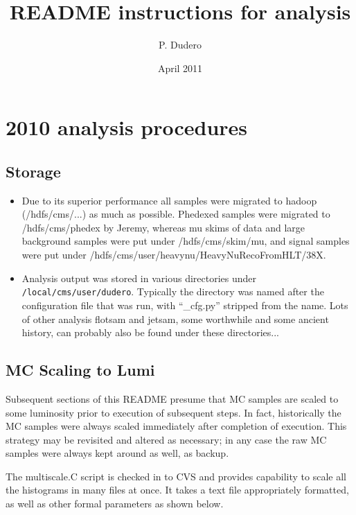 \documentclass[english]{article}
\begin{document}
\title{README instructions for analysis}
\author{P. Dudero}
\date{April 2011}
\maketitle

\lstset{basicstyle=\small}

\section{2010 analysis procedures}

\subsection{Storage}
\begin{itemize}
\item Due to its superior performance all samples were migrated to hadoop
(/hdfs/cms/...) as much as possible. Phedexed samples were migrated to
/hdfs/cms/phedex by Jeremy, whereas mu skims of data and large background
samples were put under /hdfs/cms/skim/mu, and signal samples were put under
/hdfs/cms/user/heavynu/HeavyNuRecoFromHLT/38X.
\item Analysis output was stored in various directories under
\verb#/local/cms/user/dudero#. Typically the directory was named after
the configuration file that was run, with ``\_cfg.py'' stripped from
the name.  Lots of other analysis flotsam and jetsam, some worthwhile
and some ancient history, can probably also be found under these
directories...
\end{itemize}

\subsection{MC Scaling to Lumi}
Subsequent sections of this README presume that MC samples are scaled to
some luminosity prior to execution of subsequent steps. In fact, historically
the MC samples were always scaled immediately after completion of execution.
This strategy may be revisited and altered as necessary; in any case the
raw MC samples were always kept around as well, as backup.

The multiscale.C script is checked in to CVS and provides capability to
scale all the histograms in many files at once. It takes a text file
appropriately formatted, as well as other formal parameters as shown
below.
\end{document}
